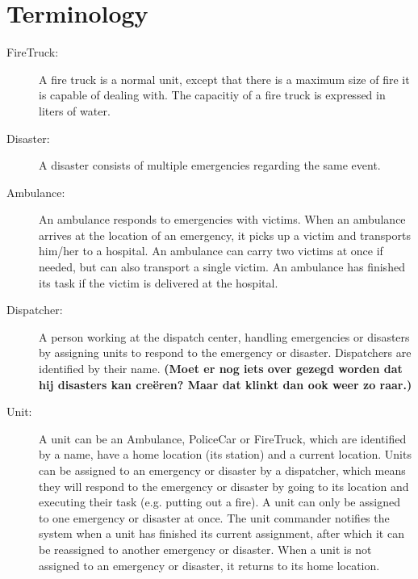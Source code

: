 \section{Terminology}
\begin{description}
  \item[FireTruck:] A fire truck is a normal unit, except that there is a maximum size of fire it is capable of dealing with. The capacitiy of a fire truck is expressed in liters of water.
  \item[Disaster:] A disaster consists of multiple emergencies regarding the same event.
  \item[Ambulance:] An ambulance responds to emergencies with victims. When an ambulance arrives at the location of an emergency, it picks up a victim and transports him/her to a hospital. An ambulance can carry two victims at once if needed, but can also transport a single victim. An ambulance has finished its task if the victim is delivered at the hospital. 
  \item[Dispatcher:] A person working at the dispatch center, handling emergencies or disasters by assigning units to respond to the emergency or disaster. Dispatchers are identified by their name. \textbf{(Moet er nog iets over gezegd worden dat hij disasters kan cre\"eren? Maar dat klinkt dan ook weer zo raar.)}
  \item[Unit:] A unit can be an Ambulance, PoliceCar or FireTruck, which are identified by a name, have a home location (its station) and a current location. Units can be assigned to an emergency or disaster by a dispatcher, which means they will respond to the emergency or disaster by going to its location and executing their task (e.g. putting out a fire). A unit can only be assigned to one emergency or disaster at once. The unit commander notifies the system when a unit has finished its current assignment, after which it can be reassigned to another emergency or disaster. When a unit is not assigned to an emergency or disaster, it returns to its home location.
\end{description}
